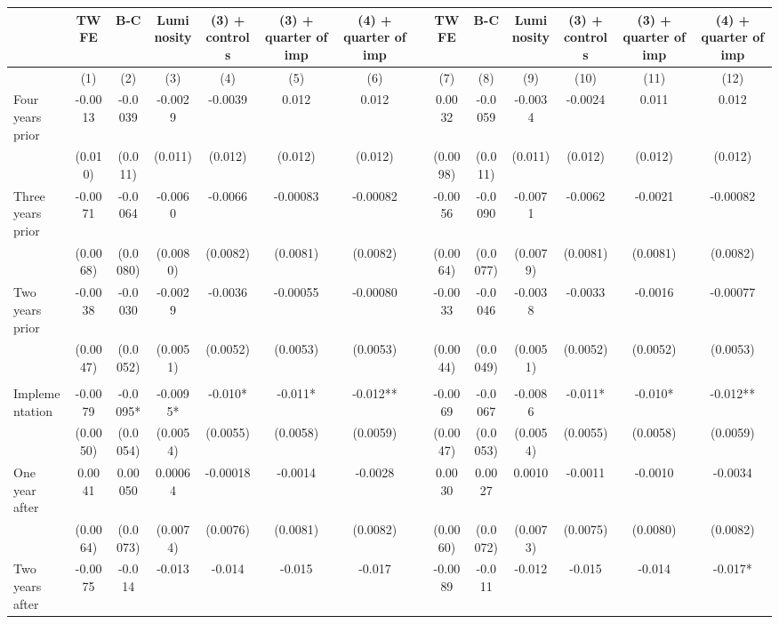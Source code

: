 \begin{tabular}{lccccccccccccc}
\toprule
      & TWFE  & B-C   & Luminosity & (3) + controls & (3) + quarter of imp & (4) + quarter of imp &       & TWFE  & B-C   & Luminosity & (3) + controls & (3) + quarter of imp & (4) + quarter of imp \\
\midrule
      & (1)   & (2)   & (3)   & (4)   & (5)   & (6)   &       & (7)   & (8)   & (9)   & (10)  & (11)  & (12) \\
\midrule
\midrule
Four years prior & -0.0013 & -0.0039 & -0.0029 & -0.0039 & 0.012 & 0.012 &       & 0.0032 & -0.0059 & -0.0034 & -0.0024 & 0.011 & 0.012 \\
      & (0.010) & (0.011) & (0.011) & (0.012) & (0.012) & (0.012) &       & (0.0098) & (0.011) & (0.011) & (0.012) & (0.012) & (0.012) \\
Three years prior & -0.0071 & -0.0064 & -0.0060 & -0.0066 & -0.00083 & -0.00082 &       & -0.0056 & -0.0090 & -0.0071 & -0.0062 & -0.0021 & -0.00082 \\
      & (0.0068) & (0.0080) & (0.0080) & (0.0082) & (0.0081) & (0.0082) &       & (0.0064) & (0.0077) & (0.0079) & (0.0081) & (0.0081) & (0.0082) \\
Two years prior & -0.0038 & -0.0030 & -0.0029 & -0.0036 & -0.00055 & -0.00080 &       & -0.0033 & -0.0046 & -0.0038 & -0.0033 & -0.0016 & -0.00077 \\
      & (0.0047) & (0.0052) & (0.0051) & (0.0052) & (0.0053) & (0.0053) &       & (0.0044) & (0.0049) & (0.0051) & (0.0052) & (0.0052) & (0.0053) \\
      &       &       &       &       &       &       &       &       &       &       &       &       &  \\
Implementation & -0.0079 & -0.0095* & -0.0095* & -0.010* & -0.011* & -0.012** &       & -0.0069 & -0.0067 & -0.0086 & -0.011* & -0.010* & -0.012** \\
      & (0.0050) & (0.0054) & (0.0054) & (0.0055) & (0.0058) & (0.0059) &       & (0.0047) & (0.0053) & (0.0054) & (0.0055) & (0.0058) & (0.0059) \\
One year after & 0.0041 & 0.00050 & 0.00064 & -0.00018 & -0.0014 & -0.0028 &       & 0.0030 & 0.0027 & 0.0010 & -0.0011 & -0.0010 & -0.0034 \\
      & (0.0064) & (0.0073) & (0.0074) & (0.0076) & (0.0081) & (0.0082) &       & (0.0060) & (0.0072) & (0.0073) & (0.0075) & (0.0080) & (0.0082) \\
Two years after & -0.0075 & -0.014 & -0.013 & -0.014 & -0.015 & -0.017 &       & -0.0089 & -0.011 & -0.012 & -0.015 & -0.014 & -0.017* \\

\end{tabular}
